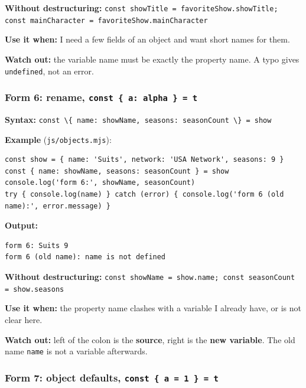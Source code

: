 \documentclass[
  10pt,
]{article}
\newcommand{\passthrough}[1]{#1}
\begin{document}
\textbf{Without destructuring:}
\passthrough{\lstinline!const showTitle = favoriteShow.showTitle; const mainCharacter = favoriteShow.mainCharacter!}

\textbf{Use it when:} I need a few fields of an object and want short
names for them.

\textbf{Watch out:} the variable name must be exactly the property name.
A typo gives \passthrough{\lstinline!undefined!}, not an error.

\hypertarget{form-6-rename-const-a-alpha-t}{%
\subsubsection{\texorpdfstring{Form 6: rename,
\texttt{const\ \{\ a:\ alpha\ \}\ =\ t}}{Form 6: rename, const \{ a: alpha \} = t}}\label{form-6-rename-const-a-alpha-t}}

\textbf{Syntax:}
\passthrough{\lstinline!const \{ name: showName, seasons: seasonCount \} = show!}

\textbf{Example} (\passthrough{\lstinline!js/objects.mjs!}):

\begin{lstlisting}
const show = { name: 'Suits', network: 'USA Network', seasons: 9 }
const { name: showName, seasons: seasonCount } = show
console.log('form 6:', showName, seasonCount)
try { console.log(name) } catch (error) { console.log('form 6 (old name):', error.message) }
\end{lstlisting}

\textbf{Output:}

\begin{lstlisting}
form 6: Suits 9
form 6 (old name): name is not defined
\end{lstlisting}

\textbf{Without destructuring:}
\passthrough{\lstinline!const showName = show.name; const seasonCount = show.seasons!}

\textbf{Use it when:} the property name clashes with a variable I
already have, or is not clear here.

\textbf{Watch out:} left of the colon is the \textbf{source}, right is
the \textbf{new variable}. The old name \passthrough{\lstinline!name!}
is not a variable afterwards.

\hypertarget{form-7-object-defaults-const-a-1-t}{%
\subsubsection{\texorpdfstring{Form 7: object defaults,
\texttt{const\ \{\ a\ =\ 1\ \}\ =\ t}}{Form 7: object defaults, const \{ a = 1 \} = t}}\label{form-7-object-defaults-const-a-1-t}}
\end{document}
